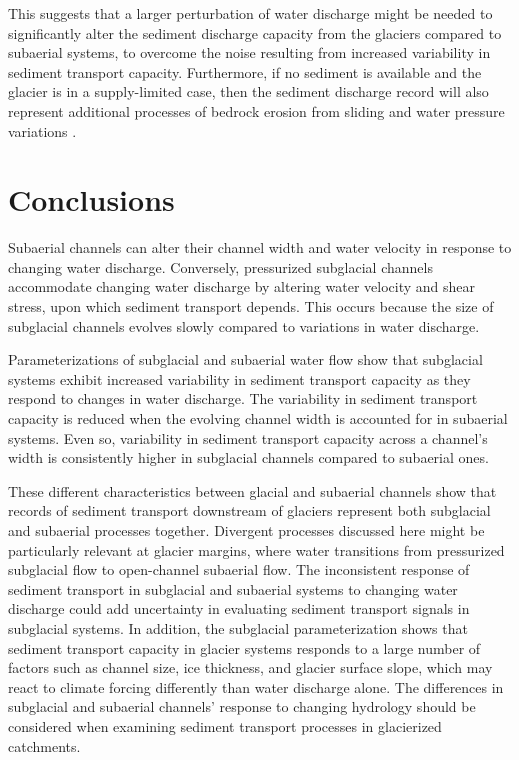 \documentclass[draft]{agujournal2019}
\begin{document}
  
  This suggests that a larger  perturbation of water discharge might be needed to significantly alter the sediment discharge capacity from the glaciers compared to subaerial systems, to overcome the noise resulting from increased variability in sediment transport capacity.
Furthermore, if no sediment is available and the glacier is in a supply-limited case, then the sediment discharge record will also represent additional processes of bedrock erosion from sliding and water pressure variations  \cite{iverson2012,herman2015}.


\section{Conclusions}
  Subaerial channels can alter their channel width and water velocity in response to changing water discharge.
  Conversely, pressurized subglacial channels accommodate changing water discharge by altering water velocity and shear stress, upon which sediment transport depends.
  This occurs because the size of subglacial channels evolves slowly compared to variations in water discharge.
  
  
  Parameterizations of subglacial and subaerial water flow show that subglacial systems exhibit increased variability in sediment transport capacity as they respond  to changes in water discharge.
  The variability in sediment transport capacity is reduced when the evolving channel width is accounted for in subaerial systems.
  Even so, variability in sediment transport capacity across a channel's width is consistently higher in subglacial channels compared to subaerial ones.
  
  These different characteristics between glacial and subaerial channels show that records of sediment transport downstream of glaciers represent both subglacial and subaerial processes together.
  Divergent processes discussed here might be particularly relevant at glacier margins, where water transitions from pressurized subglacial flow to open-channel subaerial flow.
  The inconsistent response of sediment transport in subglacial and subaerial systems to changing water discharge could add uncertainty in evaluating  sediment transport signals in subglacial systems.
  In addition, the subglacial parameterization shows that sediment transport capacity in glacier systems responds to a large number of factors such as channel size, ice thickness, and glacier surface slope, which may react to climate forcing differently than water discharge alone. 
  The differences in subglacial and subaerial channels' response to changing hydrology should be considered when examining sediment transport processes in glacierized catchments.
\end{document}
